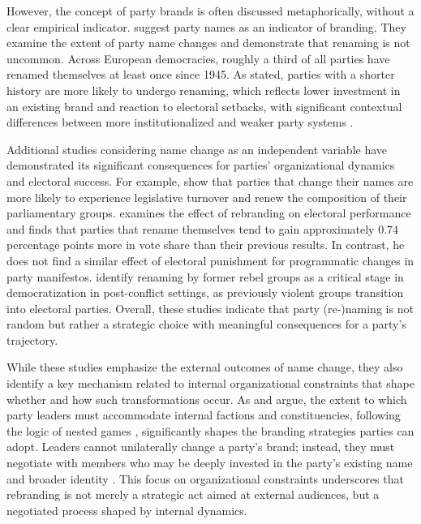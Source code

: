\documentclass[12pt]{article}
\begin{document}
However, the concept of party brands is often discussed metaphorically, without a clear empirical indicator. \citet{Kim_Solt_2017} suggest party names as an indicator of branding. They examine the extent of party name changes and demonstrate that renaming is not uncommon. Across European democracies, roughly a third of all parties have renamed themselves at least once since 1945. As stated, parties with a shorter history are more likely to undergo renaming, which reflects lower investment in an existing brand and reaction to electoral setbacks, with significant contextual differences between more institutionalized and weaker party systems \citep[see also:][]{Ibenskas_Sikk_2017, Casiraghi_Cusumano_Chryssogelos_2023, Avina_Spoon_2024}.

Additional studies considering name change as an independent variable have demonstrated its significant consequences for parties' organizational dynamics and electoral success. For example, \citet{Gouglas_Katz_Maddens_Brans_2021} show that parties that change their names are more likely to experience legislative turnover and renew the composition of their parliamentary groups. \citet{Avina_2023} examines the effect of rebranding on electoral performance and finds that parties that rename themselves tend to gain approximately 0.74 percentage points more in vote share than their previous results. In contrast, he does not find a similar effect of electoral punishment for programmatic changes in party manifestos. \citet{Ishiyama_Marshall_2017} identify renaming by former rebel groups as a critical stage in democratization in post-conflict settings, as previously violent groups transition into electoral parties. Overall, these studies indicate that party (re-)naming is not random but rather a strategic choice with meaningful consequences for a party's trajectory.

While these studies emphasize the external outcomes of name change, they also identify a key mechanism related to internal organizational constraints that shape whether and how such transformations occur. As \citet{Ishiyama_Marshall_2017} and \citet{Ishiyama_Rybalko_2023} argue, the extent to which party leaders must accommodate internal factions and constituencies, following the logic of nested games \citep{Tsebelis_1991}, significantly shapes the branding strategies parties can adopt. Leaders cannot unilaterally change a party’s brand; instead, they must negotiate with members who may be deeply invested in the party’s existing name and broader identity \citep{Lupu_2016}. This focus on organizational constraints underscores that rebranding is not merely a strategic act aimed at external audiences, but a negotiated process shaped by internal dynamics.
\end{document}
